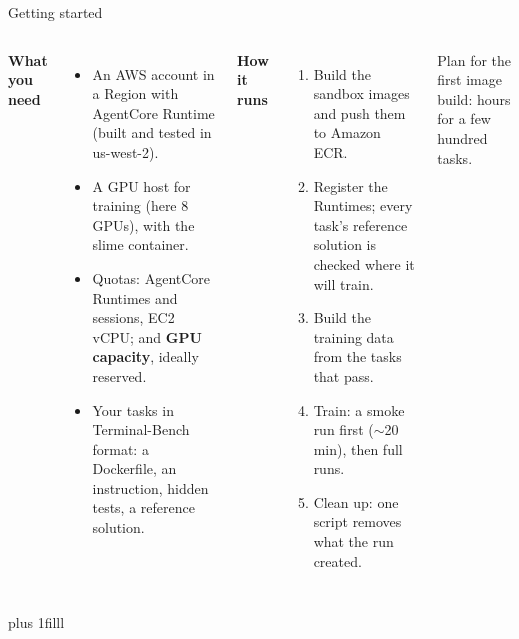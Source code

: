 \begin{frame}{Getting started}
\begin{columns}[T]
{\normalsize\textbf{What you need}}
\begin{itemize}\small\setlength{\itemsep}{1.2mm}
\item An AWS account in a Region with AgentCore Runtime (built and tested in us-west-2).
\item A GPU host for training (here 8 GPUs), with the slime container.
\item Quotas: AgentCore Runtimes and sessions, EC2 vCPU; and \textbf{GPU capacity}, ideally reserved.
\item Your tasks in Terminal-Bench format: a Dockerfile, an instruction, hidden tests, a reference solution.
\end{itemize}
{\normalsize\textbf{How it runs}}
\begin{enumerate}\small\setlength{\itemsep}{1.2mm}
\item Build the sandbox images and push them to Amazon ECR.
\item Register the Runtimes; every task's reference solution is checked where it will train.
\item Build the training data from the tasks that pass.
\item Train: a smoke run first ($\sim$20\,min), then full runs.
\item Clean up: one script removes what the run created.
\end{enumerate}
\vspace{1mm}
{\footnotesize Plan for the first image build: hours for a few hundred tasks.\par}
\end{columns}
\par\vskip 0pt plus 1filll
\end{frame}


